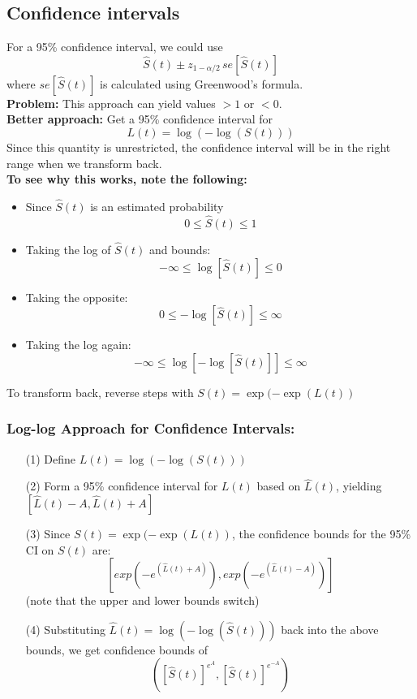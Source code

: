 \documentclass[11pt,slidesonly,semrot,portrait,palatino]{book}
\begin{document}
\subsection{Confidence intervals}

For a 95\% confidence interval, we could use
\[   \hat{S}(t)  \pm z_{1-\alpha/2} \, se[\hat{S}(t)] \]
where $se[\hat{S}(t)]$ is calculated using Greenwood's formula.
\\[2ex]
{\bf Problem:}  This approach can yield values $>1$ or $<0$.
\\[2ex]
{\bf Better approach:}  Get a 95\% confidence interval for
$$L(t) = \log(-\log(S(t)))$$
Since this quantity is unrestricted, the confidence interval will
be in the right range when we transform back.
\\[2ex]
{\bf To see why this works, note the following:}
\begin{itemize}
\item Since $\hat{S}(t)$ is an estimated probability
$$0 \leq \hat{S}(t) \leq 1$$
\item Taking the log of $\hat{S}(t)$ and bounds:
$$- \infty \le \log[\hat{S}(t)] \leq 0$$
\item Taking the opposite:
$$ 0 \le -\log[\hat{S}(t)] \leq \infty$$
\item Taking the log again:
$$ - \infty \le \log\left[-\log[\hat{S}(t)]\right] \leq \infty$$
\end{itemize}
To transform back, reverse steps with $S(t)=\exp(-\exp(L(t))$
\subsubsection{Log-log Approach for Confidence Intervals:}
\begin{itemize}
\item[(1)] Define $L(t) = \log(-\log(S(t)))$
\item[(2)] Form a 95\% confidence interval for $L(t)$ based on
$\hat{L}(t)$, yielding $[\hat{L}(t)-A,\hat{L}(t)+A]$
\item[(3)] Since $S(t)=\exp(-\exp(L(t))$, the confidence bounds
for the 95\% CI on $S(t)$ are:
$$[exp(-e^{(\hat{L}(t)+A)}),exp(-e^{(\hat{L}(t)-A)})]$$
(note that the upper and lower bounds switch)
\item[(4)] Substituting $\hat{L}(t)=\log(-\log(\hat{S}(t)))$
back into the above bounds, we get confidence bounds of
$$([\hat{S}(t)]^{e^A},[\hat{S}(t)]^{e^{-A}})$$
\end{itemize}
\end{document}
